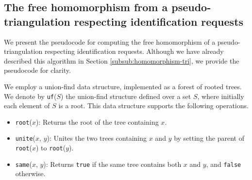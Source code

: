 \documentclass[main.tex]{subfiles}
\begin{document}
\subsection{The free homomorphism from a pseudo-triangulation respecting identification requests}
We present the pseudocode for computing the free homomorphism of a pseudo-triangulation respecting identification requests. Although we have already described this algorithm in Section \ref{subsub:homomorphism-tri}, we provide the pseudocode for clarity.

We employ a union-find data structure, implemented as a forest of rooted trees.
We denote by \texttt{uf}($S$) the union-find structure defined over a set $S$, where
initially each element of $S$ is a root.
This data structure supports the following operations.

\begin{itemize}
    \item \texttt{root}($x$): Returns the root of the tree containing $x$.
    \item \texttt{unite}($x$, $y$): Unites the two trees containing $x$ and $y$ by setting the parent of \texttt{root}($x$) to \texttt{root}($y$).
    \item \texttt{same}($x$, $y$): Returns \texttt{true} if the same tree contains both $x$ and $y$, and \texttt{false} otherwise.
\end{itemize}
\end{document}
